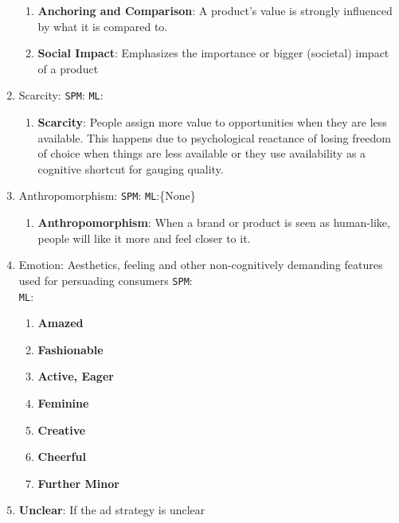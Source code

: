 \begin{enumerate}
\begin{enumerate}
        \item \textbf{Anchoring and Comparison}: A product's value is strongly influenced by what it is compared to.

        \item \textbf{Social Impact}: Emphasizes the importance or bigger (societal) impact of a product 
    \end{enumerate}

    \item Scarcity: \texttt{SPM}: \cite{brehm1966theory,lynn1991scarcity,rothman1999systematic,tversky1985framing} \texttt{ML}:\cite{yang2019let,ChenYang2021,shaikh-etal-2020-examining}
    \begin{enumerate}
        \item \textbf{Scarcity}: People assign more value to opportunities when they are less available. This happens due to psychological reactance of losing freedom of choice when things are less available or they use availability as a cognitive shortcut for gauging quality. 
    \end{enumerate}

    \item Anthropomorphism: \texttt{SPM}:\cite{fournier1998consumers,levesque2020human,epley2007seeing} \texttt{ML}:\{None\}
    \begin{enumerate}
        \item \textbf{Anthropomorphism}: When a brand or product is seen as human-like, people will like it more and feel closer to it.
    \end{enumerate}

    \item Emotion: Aesthetics, feeling and other non-cognitively demanding features used for persuading consumers \texttt{SPM}:\cite{hibbert2007guilt,petty1986elaboration,petty1983central}\\\texttt{ML}:\cite{yang2019let,tan2016winning,hidey2017analyzing,he2018decoupling,durmus-cardie-2018-exploring,zhang2017characterizing,wachsmuth2017computational}
    \begin{enumerate}
        \item \textbf{Amazed}
        \item \textbf{Fashionable}
        \item \textbf{Active, Eager}
        \item \textbf{Feminine}
        \item \textbf{Creative}
        \item \textbf{Cheerful}
        \item \textbf{Further Minor}
    \end{enumerate}

    \item \textbf{Unclear}: If the ad strategy is unclear     
\end{enumerate}


